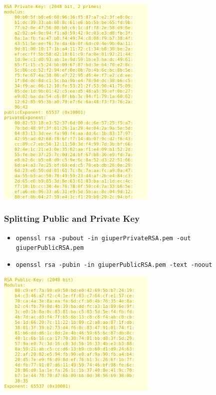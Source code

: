 \documentclass[]{beamer}
\begin{document}
{\begin{frame}
\begin{center}
\includegraphics[width=3in]{imgs/rsaPrivateInform.png}
\end{center}
\end{frame}

\begin{frame}
\frametitle{Splitting Public and Private Key}

\begin{itemize}
\item{\color{blue} \tt openssl rsa -pubout -in giuperPrivateRSA.pem -out giuperPublicRSA.pem}
\item{\color{blue} \tt openssl rsa -pubin -in giuperPublicRSA.pem -text -noout}
\end{itemize}

\begin{center}
\includegraphics[width=3in]{imgs/rsaPublicInform.png}
\end{center}
\end{frame}

}
\end{document}
